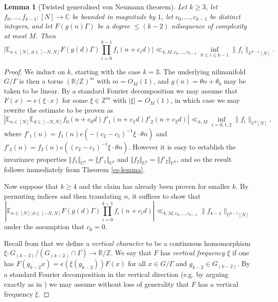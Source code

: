 \documentclass[11pt,reqno]{amsart}
\numberwithin{equation}{section}
\theoremstyle{plain}
\newtheorem{lemma}[subsection]{Lemma}
\theoremstyle{definition}
\renewcommand{\leq}{\leqslant}
\renewcommand{\geq}{\geqslant}
\newcommand\E{{\mathbb{E}}}
\newcommand\Z{\mathbb{Z}}
\newcommand\R{\mathbb{R}}
\newcommand\C{\mathbb{C}}
\newcommand\1{{\bf 1}}
\newcommand\2{{\bf 2}}
\begin{document}
\begin{lemma}[Twisted generalised von Neumann theorem]\label{gvn-twist} Let $k \geq 3$, let $f_0,\ldots,f_{k-1}: [N] \to \C$ be bounded in magnitude by $1$, let $c_0,\dots, c_{k-1}$ be distinct integers, and let $F(g(n)\Gamma)$ be a degree $\leq (k-2)$ nilsequence of complexity at most $M$.  Then
$$ \big|\E_{n \in [N],d \in [-N,N]} F(g(d)\Gamma) \prod_{i=0}^{k-1} f_i(n + c_i d)\big| \ll_{k,M,c_0,\dots, c_{k-1}} \inf_{0 \leq i \leq k-1} \|f_i\|_{U^{k-1}[N]}.$$
\end{lemma}
\begin{proof}  We induct on $k$, starting with the case $k = 3$. The underlying nilmanifold $G/\Gamma$ is then a torus $(\R/\Z)^m$ with $m = O_M(1)$, and $g(n) = \theta n + \theta_0$ may be taken to be linear. By a standard Fourier decomposition we may assume that $F(x) = e(\xi \cdot x)$ for some $\xi \in \Z^m$ with $|\xi| = O_M(1)$, in which case we may rewrite the estimate to be proven as
\[ |\E_{n \in [N]} \E_{d \in [-N,N]} f_0(n + c_0 d) f'_1 (n + c_1 d) f'_2 (n + c_2 d)| \ll_{k,M} \inf_{i = 0,1,2} \| f_i \|_{U^2[N]},\]
where $f'_1(n) = f_1(n) e(-(c_2 - c_1)^{-1}\xi \cdot \theta n)$ and $f'_2(n) = f_2(n) e((c_2 - c_1)^{-1}\xi \cdot \theta n)$. However it is easy to establish the invariance properties $\Vert f_1 \Vert_{U^2} = \Vert f'_1\Vert_{U^2}$ and $\Vert f_2 \Vert_{U^2} = \Vert f'_2 \Vert_{U^2}$, and so the result follows immediately from Theorem \ref{cs-lemma}.

Now suppose that $k \geq 4$ and the claim has already been proven for smaller $k$.  By permuting indices and then translating $n$, it suffices to show that
\begin{equation}\label{endit}
 |\E_{n \in [N]; d \in [-N,N]} F(g(d)\Gamma) \prod_{i=0}^{k-1} f_i(n + c_i d)| \ll_{k,M,c_0,\ldots,c_{k-1}} \|f_{k-1}\|_{U^{k-1}[N]}
 \end{equation}
under the assumption that $c_0=0$.

Recall from \cite{green-tao-nilratner} that we define a \emph{vertical character} to be a continuous homomorphism $\xi: G_{(k-2)}/(G_{(k-2)} \cap \Gamma) \to \R/\Z$.  We say that $F$ has \emph{vertical frequency} $\xi$ if one has $F(g_{k-2} x) = e(\xi(g_{k-2})) F(x)$ for all $x \in G/\Gamma$ and $g_{k-2} \in G_{(k-2)}$.  By a standard Fourier decomposition in the vertical direction (e.g. by arguing exactly as in \cite[Lemma 3.7]{green-tao-nilratner}) we may assume without loss of generality that $F$ has a vertical frequency $\xi$.


\end{proof}
\end{document}

